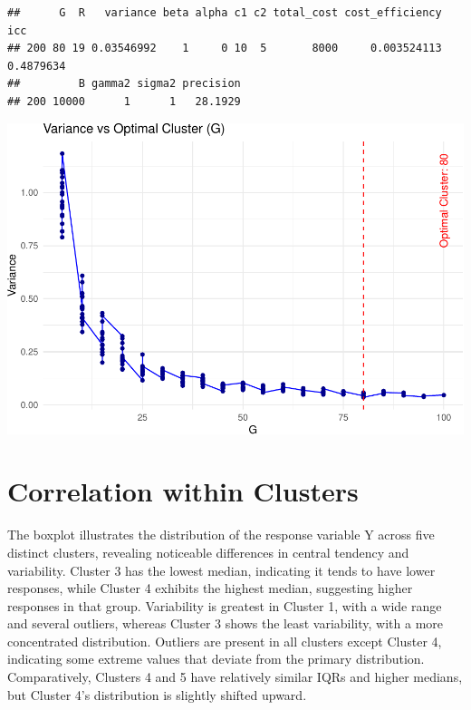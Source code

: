 \documentclass[
]{article}
\begin{document}
\begin{verbatim}
##      G  R   variance beta alpha c1 c2 total_cost cost_efficiency       icc
## 200 80 19 0.03546992    1     0 10  5       8000     0.003524113 0.4879634
##         B gamma2 sigma2 precision
## 200 10000      1      1   28.1929
\end{verbatim}

\begin{center}\includegraphics{Project3Simulation_files/figure-latex/unnamed-chunk-5-1} \end{center}

\hypertarget{correlation-within-clusters}{%
\section{Correlation within
Clusters}\label{correlation-within-clusters}}

The boxplot illustrates the distribution of the response variable Y
across five distinct clusters, revealing noticeable differences in
central tendency and variability. Cluster 3 has the lowest median,
indicating it tends to have lower responses, while Cluster 4 exhibits
the highest median, suggesting higher responses in that group.
Variability is greatest in Cluster 1, with a wide range and several
outliers, whereas Cluster 3 shows the least variability, with a more
concentrated distribution. Outliers are present in all clusters except
Cluster 4, indicating some extreme values that deviate from the primary
distribution. Comparatively, Clusters 4 and 5 have relatively similar
IQRs and higher medians, but Cluster 4's distribution is slightly
shifted upward.
\end{document}
